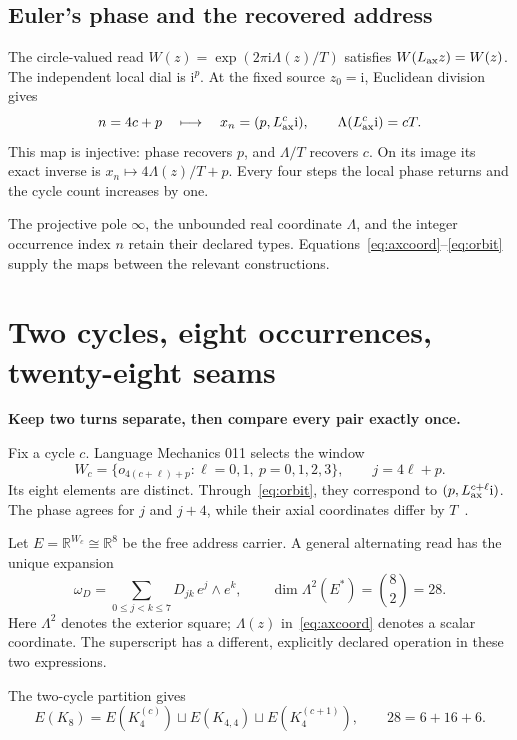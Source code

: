 \documentclass[11pt]{article}
\theoremstyle{definition}\newtheorem{definition}[theorem]{Definition}
\newcommand{\R}{\mathbb R}\newcommand{\C}{\mathbb C}\newcommand{\Z}{\mathbb Z}\newcommand{\N}{\mathbb N}\newcommand{\PP}{\mathbb P}
\newcommand{\mi}{\mathrm i}\newcommand{\tr}{\mathsf T}
\newcommand{\lead}[1]{\textbf{#1}\par}
\newcommand{\page}{\clearpage}
\begin{document}
\subsection{Euler's phase and the recovered address}
The circle-valued read $W(z)=\exp(2\pi\mi\Lambda(z)/T)$ satisfies
$W(L_{\mathrm{ax}}z)=W(z)$. The independent local dial is $\mi^p$. At the fixed source $z_0=\mi$, Euclidean division gives
\begin{equation}
 n=4c+p\quad\longmapsto\quad x_n=(p,L_{\ax}^{c}\mi),\qquad
 \Lambda(L_{\ax}^{c}\mi)=cT.
 \label{eq:orbit}
\end{equation}
This map is injective: phase recovers $p$, and $\Lambda/T$ recovers $c$. On its image its exact inverse is $x_n\mapsto4\Lambda(z)/T+p$. Every four steps the local phase returns and the cycle count increases by one.

The projective pole $\infty$, the unbounded real coordinate $\Lambda$, and the integer occurrence index $n$ retain their declared types. Equations~\eqref{eq:axcoord}--\eqref{eq:orbit} supply the maps between the relevant constructions.

\page
\section{Two cycles, eight occurrences, twenty-eight seams}
\lead{Keep two turns separate, then compare every pair exactly once.}
Fix a cycle $c$. Language Mechanics 011 selects the window
\begin{equation}
 W_c=\{o_{4(c+\ell)+p}:\ell=0,1,\ p=0,1,2,3\},\qquad j=4\ell+p.
 \label{eq:window}
\end{equation}
Its eight elements are distinct. Through~\eqref{eq:orbit}, they correspond to
$(p,L_{\ax}^{c+\ell}\mi)$. The phase agrees for $j$ and $j+4$, while their axial coordinates differ by $T$~\cite{LM11,METL}.

Let $E=\R^{W_c}\cong\R^8$ be the free address carrier. A general alternating read has the unique expansion
\begin{equation}
 \omega_D=\sum_{0\le j<k\le7}D_{jk}\,e^j\wedge e^k,
 \qquad\dim\Lambda^2(E^*)=\binom82=28.
 \label{eq:28}
\end{equation}
Here $\Lambda^2$ denotes the exterior square; $\Lambda(z)$ in~\eqref{eq:axcoord} denotes a scalar coordinate. The superscript has a different, explicitly declared operation in these two expressions.

The two-cycle partition gives
\begin{equation}
 E(K_8)=E(K_4^{(c)})\sqcup E(K_{4,4})\sqcup E(K_4^{(c+1)}),
 \qquad28=6+16+6.
 \label{eq:6166}
\end{equation}
\end{document}
